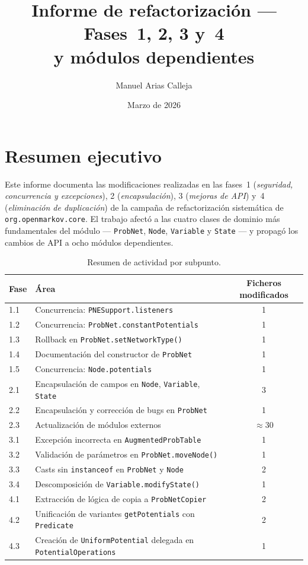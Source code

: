 \documentclass[11pt,a4paper]{article}
\title{Informe de refactorización --- Fases~1, 2, 3 y~4\\
       \large \code{org.openmarkov.core} y módulos dependientes}
\author{Manuel Arias Calleja}
\date{Marzo de 2026}
\newcommand{\code}[1]{\texttt{#1}}
\begin{document}
\maketitle
\tableofcontents
\newpage

\section*{Resumen ejecutivo}

Este informe documenta las modificaciones realizadas en las fases~1
(\emph{seguridad, concurrencia y excepciones}), 2 (\emph{encapsulación}),
3 (\emph{mejoras de API}) y~4 (\emph{eliminación de duplicación}) de la
campaña de refactorización sistemática de \code{org.openmarkov.core}.
El trabajo afectó a las cuatro clases de dominio más fundamentales del
módulo --- \code{ProbNet}, \code{Node}, \code{Variable} y \code{State} ---
y propagó los cambios de API a ocho módulos dependientes.

\begin{table}[!htbp]
\centering
\begin{tabular}{llc}
\toprule
\textbf{Fase} & \textbf{Área} & \textbf{Ficheros modificados} \\
\midrule
1.1 & Concurrencia: \code{PNESupport.listeners}       & 1 \\
1.2 & Concurrencia: \code{ProbNet.constantPotentials} & 1 \\
1.3 & Rollback en \code{ProbNet.setNetworkType()}     & 1 \\
1.4 & Documentación del constructor de \code{ProbNet} & 1 \\
1.5 & Concurrencia: \code{Node.potentials}            & 1 \\
2.1 & Encapsulación de campos en \code{Node}, \code{Variable}, \code{State} & 3 \\
2.2 & Encapsulación y corrección de bugs en \code{ProbNet} & 1 \\
2.3 & Actualización de módulos externos               & $\approx$30 \\
3.1 & Excepción incorrecta en \code{AugmentedProbTable} & 1 \\
3.2 & Validación de parámetros en \code{ProbNet.moveNode()} & 1 \\
3.3 & Casts sin \code{instanceof} en \code{ProbNet} y \code{Node} & 2 \\
3.4 & Descomposición de \code{Variable.modifyState()} & 1 \\
4.1 & Extracción de lógica de copia a \code{ProbNetCopier}        & 2 \\
4.2 & Unificación de variantes \code{getPotentials} con \code{Predicate} & 2 \\
4.3 & Creación de \code{UniformPotential} delegada en \code{PotentialOperations} & 1 \\
\bottomrule
\end{tabular}
\caption{Resumen de actividad por subpunto.}
\end{table}
\end{document}
